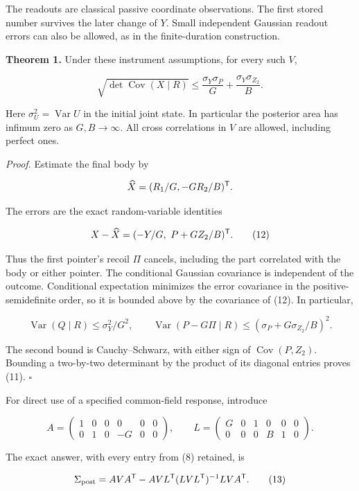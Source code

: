 \documentclass[11pt,a4paper]{article}
\begin{document}
The readouts are classical passive coordinate observations. The first
stored number survives the later change of \(Y\). Small independent
Gaussian readout errors can also be allowed, as in the finite-duration
construction.

\textbf{Theorem 1.} Under these instrument assumptions, for every such
\(V\),

\[\boxed{\sqrt{\det\operatorname{Cov}(X\mid R)}
\le\frac{\sigma_Y\sigma_P}{G}
       +\frac{\sigma_Y\sigma_{Z_2}}{B}.} \tag{11}\]

Here \(\sigma_U^2=\operatorname{Var}U\) in the initial joint state. In
particular the posterior area has infimum zero as \(G,B\to\infty\). All
cross correlations in \(V\) are allowed, including perfect ones.

\emph{Proof.} Estimate the final body by

\[\widehat X=(R_1/G,-GR_2/B)^{\sf T}.\]

The errors are the exact random-variable identities

\[X-\widehat X=(-Y/G,\ P+GZ_2/B)^{\sf T}. \tag{12}\]

Thus the first pointer's recoil \(\Pi\) cancels, including the part
correlated with the body or either pointer. The conditional Gaussian
covariance is independent of the outcome. Conditional expectation
minimizes the error covariance in the positive-semidefinite order, so it
is bounded above by the covariance of (12). In particular,

\[\operatorname{Var}(Q\mid R)\le\sigma_Y^2/G^2,\qquad
\operatorname{Var}(P-G\Pi\mid R)
\le(\sigma_P+G\sigma_{Z_2}/B)^2.\]

The second bound is Cauchy--Schwarz, with either sign of
\(\operatorname{Cov}(P,Z_2)\). Bounding a two-by-two determinant by the
product of its diagonal entries proves (11). \(\square\)

For direct use of a specified common-field response, introduce

\[A=\begin{pmatrix}1&0&0&0&0&0\\0&1&0&-G&0&0\end{pmatrix},
\qquad
L=\begin{pmatrix}G&0&1&0&0&0\\0&0&0&B&1&0\end{pmatrix}.\]

The exact answer, with every entry from (8) retained, is

\[\Sigma_{\rm post}=AVA^{\sf T}
 -AVL^{\sf T}(LVL^{\sf T})^{-1}LVA^{\sf T}. \tag{13}\]
\end{document}
